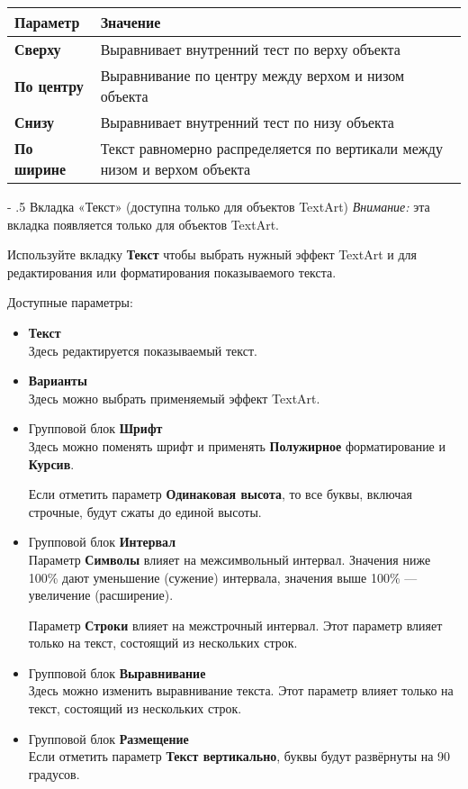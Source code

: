 ﻿\documentclass[a4paper,10pt]{article}
\makeatletter
\renewcommand\paragraph{%
   \@startsection{paragraph}{4}{0mm}%
      {-\baselineskip}%
      {.5\baselineskip}%
      {\normalfont\normalsize\bfseries}}
\makeatother
\begin{document}
\begin{center}
\begin{tabular}{  m{3cm}  m{13cm}  }
 \textbf{Параметр} & \textbf{Значение}\\ 
 \hline
  \textbf{Сверху} & Выравнивает внутренний тест по верху объекта\\
  \textbf{По центру} & Выравнивание по центру между верхом и низом объекта\\ 
\textbf{Снизу} & Выравнивает внутренний тест по низу объекта\\
\textbf{По ширине} & Текст равномерно распределяется по вертикали между низом и верхом объекта\\
\end{tabular}
\end{center}

\paragraph{Вкладка «Текст» (доступна только для объектов TextArt)}
\textit{Внимание:} эта вкладка появляется только для объектов TextArt.

Используйте вкладку \textbf{Текст} чтобы выбрать нужный эффект TextArt и для редактирования или форматирования показываемого текста.

Доступные параметры:
\begin{itemize}
 \item \textbf{Текст}\\
 Здесь редактируется показываемый текст.
 \item \textbf{Варианты}\\
 Здесь можно выбрать применяемый эффект TextArt.
 \item Групповой блок \textbf{Шрифт}\\
 Здесь можно поменять шрифт и применять \textbf{Полужирное} форматирование и \textbf{Курсив}.
 
 Если отметить параметр \textbf{Одинаковая высота}, то все буквы, включая строчные, будут сжаты до единой высоты.
 \item Групповой блок \textbf{Интервал}\\
 Параметр \textbf{Символы} влияет на межсимвольный интервал. Значения ниже 100\% дают уменьшение (сужение) интервала, значения выше 100\% — увеличение (расширение).
 
 Параметр \textbf{Строки} влияет на межстрочный интервал. Этот параметр влияет только на текст, состоящий из нескольких строк.
 
 \item Групповой блок \textbf{Выравнивание}\\
 Здесь можно изменить выравнивание текста. Этот параметр влияет только на текст, состоящий из нескольких строк.
 
 \item Групповой блок \textbf{Размещение}\\
 Если отметить параметр \textbf{Текст вертикально}, буквы будут развёрнуты на 90 градусов.
\end{itemize}
\end{document}
